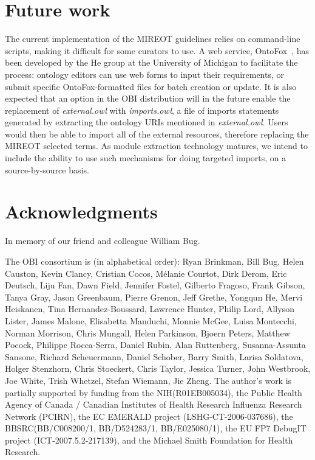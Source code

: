 \documentclass[jou]{ao2e}%
\begin{document}
\section{Future work}
The current implementation of the \ac{MIREOT} guidelines relies on command-line scripts, making it difficult for some curators to use. 
A web service, OntoFox~\citep{OntoFox}, has been developed by the He group at the University of Michigan to facilitate the process: ontology editors can use web forms to input their requirements, or submit specific OntoFox-formatted files for batch creation or update.
It is also expected that an option in the \ac{OBI} distribution will in the future enable the replacement of \emph{external.owl} with \emph{imports.owl}, a file of imports statements generated by extracting the ontology URIs mentioned in \emph{external.owl}. Users would then be able to import all of the external resources, therefore replacing the MIREOT selected terms.  As module extraction technology matures, we intend to include the ability to use such mechanisms for doing targeted imports, on a source-by-source basis.%

\section*{Acknowledgments}

In memory of our friend and colleague William Bug. 

The OBI consortium is (in alphabetical order): Ryan Brinkman, Bill Bug, Helen Causton, Kevin Clancy, Cristian Cocos, M\'elanie Courtot, Dirk Derom, Eric Deutsch, Liju Fan, Dawn Field, Jennifer Fostel, Gilberto Fragoso, Frank Gibson, Tanya Gray, Jason Greenbaum, Pierre Grenon, Jeff Grethe, Yongqun He, Mervi Heiskanen, Tina Hernandez-Boussard, Lawrence Hunter, Philip Lord, Allyson Lister, James Malone, Elisabetta Manduchi, Monnie McGee, Luisa Montecchi, Norman Morrison, Chris Mungall, Helen Parkinson, Bjoern Peters, Matthew Pocock, Philippe Rocca-Serra, Daniel Rubin, Alan Ruttenberg, Susanna-Assunta Sansone, Richard Scheuermann, Daniel Schober, Barry Smith, Larisa Soldatova, Holger Stenzhorn, Chris Stoeckert, Chris Taylor, Jessica Turner, John Westbrook,  Joe White, Trish Whetzel, Stefan Wiemann, Jie Zheng. 
The author's work is partially supported by funding from the NIH(R01EB005034),  the Public Health Agency of Canada / Canadian Institutes of Health Research Influenza Research Network (PCIRN), the EC EMERALD project (LSHG-CT-2006-037686), the BBSRC(BB/C008200/1, BB/D524283/1, BB/E025080/1), the EU FP7 DebugIT project (ICT-2007.5.2-217139), and the Michael Smith Foundation for Health Research.
\end{document}
